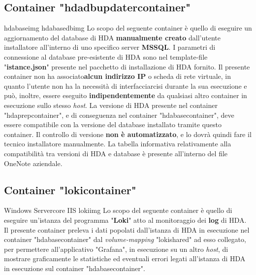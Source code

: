 \subsection{Container "hdadbupdatercontainer"}
\begin{namespacedesc}
	 {hdabaseimg}
	 {hdabasedbimg}
	 {Lo scopo del seguente container è quello di eseguire un aggiornamento del database di HDA \textbf{manualmente creato} dall'utente installatore all'interno di uno specifico server \textbf{MSSQL}. I parametri di connessione al database pre-esistente di HDA sono nel template-file "\textbf{istance.json}" presente nel pacchetto di installazione di HDA fornito.
Il presente container non ha associato\textbf{alcun indirizzo IP} o scheda di rete virtuale, in quanto l'utente non ha la necessità di interfacciarcisi durante la sua esecuzione e può, inoltre, essere eseguito \textbf{indipendentemente} da qualsiasi altro container in esecuzione sullo stesso \textit{host}.
La versione di HDA presente nel container "hdaprepcontainer", e di conseguenza nel container "hdabasecontainer", deve essere compatibile con la versione del database installato tramite questo container. Il controllo di versione \textbf{non è automatizzato}, e lo dovrà quindi fare il tecnico installatore manualmente. La tabella informativa relativamente alla compatibilità tra versioni di HDA e database è presente all'interno del file OneNote aziendale.  
}
\end{namespacedesc}
\newpage
\subsection{Container "lokicontainer"}
\begin{namespacedesc}
	 {Windows Servercore IIS}
	 {lokiimg}
	 {Lo scopo del seguente container è quello di eseguire un'istanza del programma "\textbf{Loki}" atto al monitoraggio dei \textbf{log} di HDA. Il presente container preleva i dati popolati dall'istanza di HDA in esecuzione nel container "hdabasecontainer" dal \textit{volume-mapping} "lokishared" ad esso collegato, per permettere all'applicativo "Grafana", in esecuzione su un altro \textit{host}, di mostrare graficamente le statistiche ed eventuali errori legati all'istanza di HDA in esecuzione sul container "hdabasecontainer".}
\end{namespacedesc}

